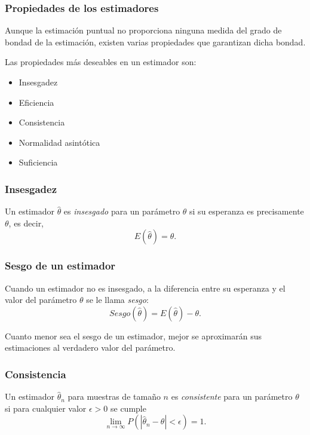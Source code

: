 \begin{frame}
\frametitle{Propiedades de los estimadores}
Aunque la estimación puntual no proporciona ninguna medida del grado de bondad de la estimación, existen varias propiedades que garantizan dicha bondad.

Las propiedades más deseables en un estimador son:
\begin{itemize}
\item Insesgadez
\item Eficiencia
\item Consistencia
\item Normalidad asintótica
\item Suficiencia
\end{itemize} 
\end{frame}


\begin{frame}
\frametitle{Insesgadez}
\begin{definicion}
Un estimador $\hat \theta$ es \emph{insesgado} para un parámetro $\theta$ si su esperanza es precisamente $\theta$, es decir,
\[
E(\hat \theta)=\theta.
\]
\end{definicion}
\begin{center}
\scalebox{0.58}{}
\end{center}
\end{frame}


\begin{frame}
\frametitle{Sesgo de un estimador}
Cuando un estimador no es insesgado, a la diferencia entre su esperanza y el valor del parámetro $\theta$ se le llama \emph{sesgo}:
\[
Sesgo(\hat \theta) = E(\hat \theta)-\theta.
\]

Cuanto menor sea el sesgo de un estimador, mejor se aproximarán sus estimaciones al verdadero valor del parámetro.
\end{frame}


\begin{frame}
\frametitle{Consistencia}
\begin{definicion}
Un estimador $\hat \theta_n$ para muestras de tamaño $n$ es \emph{consistente} para un parámetro $\theta$ si para cualquier valor $\epsilon>0$ se cumple
\[
\lim_{n\rightarrow \infty} P(|\hat \theta_n-\theta|<\epsilon)=1.
\]
\end{definicion}
\begin{center}
\scalebox{0.55}{}
\scalebox{0.55}{}
\end{center}
\end{frame}


